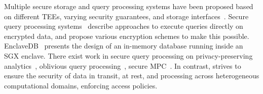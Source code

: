 Multiple secure storage and query processing systems have been proposed based on different TEEs, varying security guarantees, and storage interfaces~\cite{kim-eurosys-2019, pesos-eurosys-2018, ahmad2018obliviate, ahmad2018obliviate, bailleu2019Speicher,dickens-asplos-2018}. 
Secure query processing systems~\cite{popa-sosp-2011, tu-vldb-2013, seabed-osdi-2016} describe approaches to execute queries directly on encrypted data, and propose various encryption schemes to make this possible. %
EnclaveDB~\cite{priebe-ieeesp-2018} presents the design of an in-memory database running inside an SGX enclave. %
There exist work in secure query processing on privacy-preserving analytics~\cite{djoin-osdi-2012, emekci-icde-priv-preser-third-party, privatesql-vldb, PINQ-sigmod}, oblivious query processing~\cite{oblix-oakland-2018, 222619, 10.14778/3342263.3342641}, secure MPC~\cite{conclave-eurosys}.
In contrast, \project{} strives to ensure the security of data in transit, at rest, and processing across heterogeneous computational domains, enforcing access policies. %

